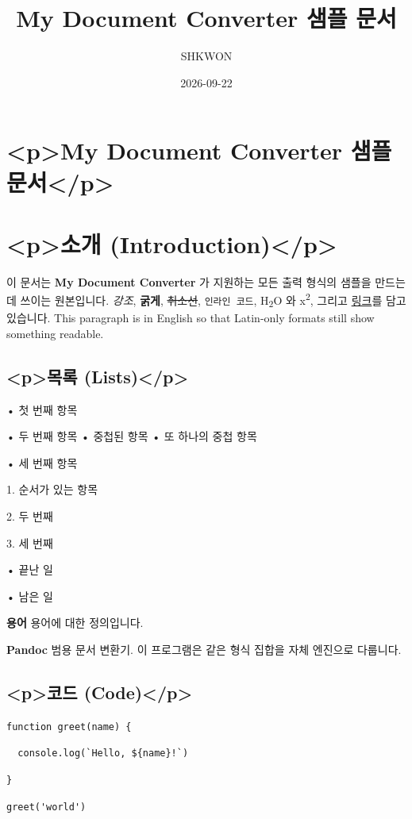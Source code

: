 \documentclass[11pt]{article}
\title{My Document Converter 샘플 문서}
\author{SHKWON}
\date{2026-09-22}
\begin{document}
\maketitle

\section*{<p>My Document Converter 샘플 문서</p>}\label{pmy-document-converter-샘플-문서p}

\section*{<p>소개 (Introduction)</p>}\label{p소개-introductionp}

이 문서는 \textbf{My Document Converter} 가 지원하는 모든 출력 형식의 샘플을 만드는 데 쓰이는
원본입니다. \emph{강조}, \textbf{굵게}, \sout{취소선}, \verb|인라인 코드|,
H\textsubscript{2}O 와 x\textsuperscript{2}, 그리고
\href{https://example.com}{링크}를 담고 있습니다. This paragraph is in English so
that Latin-only formats still show something readable.

\subsection*{<p>목록 (Lists)</p>}\label{p목록-listsp}

• 첫 번째 항목

• 두 번째 항목 • 중첩된 항목 • 또 하나의 중첩 항목

• 세 번째 항목

1. 순서가 있는 항목

2. 두 번째

3. 세 번째

• 끝난 일

• 남은 일

\textbf{용어} 용어에 대한 정의입니다.

\textbf{Pandoc} 범용 문서 변환기. 이 프로그램은 같은 형식 집합을 자체 엔진으로 다룹니다.

\subsection*{<p>코드 (Code)</p>}\label{p코드-codep}

\verb|function greet(name) {|

\verb|  console.log(`Hello, ${name}!`)|

\verb|}|

\verb|greet('world')|
\end{document}
